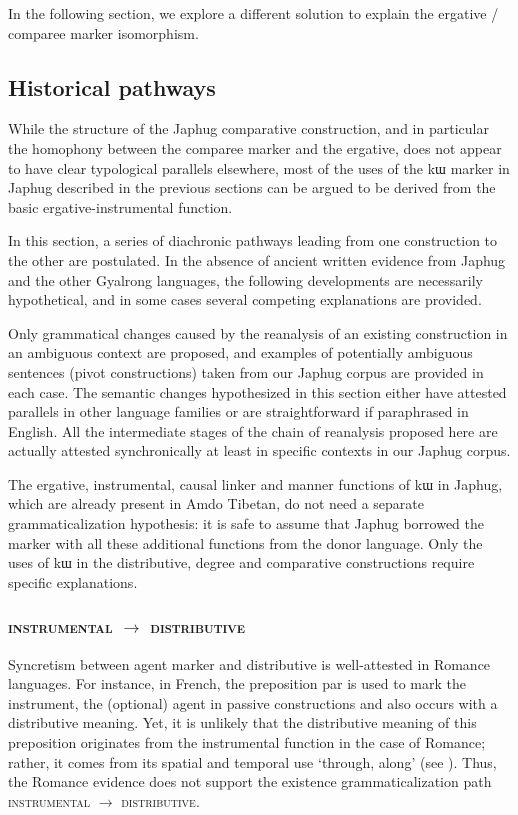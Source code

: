 \documentclass[oldfontcommands,oneside,a4paper,11pt]{article}
\newcommand{\ipa}[1]{{\phon #1}} %
\begin{document}
In the following section, we explore a different solution to explain the ergative / comparee marker isomorphism.
 
\subsection{Historical pathways}


While the structure of the Japhug comparative construction, and in particular the homophony between the comparee marker and the ergative, does not appear to have clear typological parallels elsewhere, most of the uses of the \ipa{kɯ} marker in Japhug described in the previous sections can be argued to be derived from the basic ergative-instrumental function. 

In this section, a series of diachronic pathways leading from one construction to the other are postulated. In the absence of ancient written evidence from Japhug and the other Gyalrong languages, the following developments are necessarily hypothetical, and in some cases several competing explanations are provided.

Only grammatical changes caused by the reanalysis of an existing construction in an ambiguous context are proposed, and examples of potentially ambiguous sentences (pivot constructions) taken from our Japhug corpus are provided in each case. The semantic changes hypothesized in this section  either have  attested parallels in other language families or are straightforward if paraphrased in English. All the intermediate stages of the chain of reanalysis proposed here are actually attested synchronically at least in specific contexts in our Japhug corpus.

The ergative, instrumental, causal linker and manner functions of \ipa{kɯ} in Japhug, which are already present in Amdo Tibetan, do not need a separate grammaticalization hypothesis: it is safe to assume that Japhug borrowed the marker with all these additional functions from the donor language. Only the uses of \ipa{kɯ} in the distributive, degree and comparative constructions require specific explanations.

 \subsubsection{\textsc{instrumental} $\rightarrow$ \textsc{distributive} }
  
Syncretism between agent marker and distributive is well-attested in Romance languages. For instance, in French, the preposition  \ipa{par}  is used to mark the instrument, the (optional) agent in passive constructions and also occurs with a distributive meaning. Yet, it is unlikely that the distributive meaning of this preposition originates from the instrumental function in the case of Romance; rather, it comes from its  spatial and temporal use `through, along' (see \citealt[213]{wartburg58few8}). 
Thus, the Romance evidence does not support the existence grammaticalization path \textsc{instrumental} $\rightarrow$ \textsc{distributive}.
\end{document}
